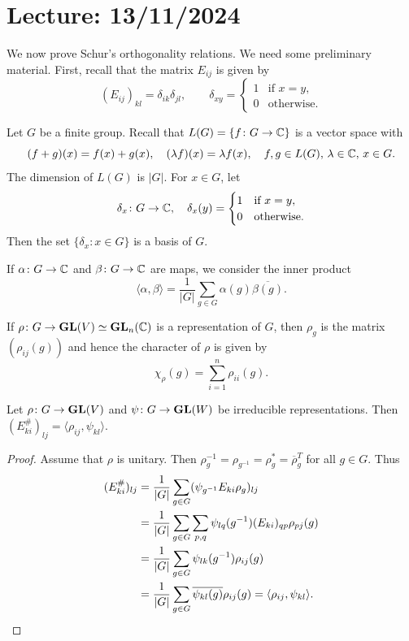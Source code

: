\section{Lecture: 13/11/2024}
\label{8}

We now prove Schur's orthogonality relations. We need some preliminary material. First, recall that 
the matrix $E_{ij}$ is given by 
\[
(E_{ij})_{kl}=\delta_{ik}\delta_{jl},
\qquad
\delta_{xy}=\begin{cases}
    1 & \text{if $x=y$},\\
    0 & \text{otherwise}.
\end{cases}
\]

Let $G$ be a finite group. 
Recall that $L(G)=\{f\colon G\to\mathbb{C}\}$ is a vector space with
\[
    (f+g)(x)=f(x)+g(x),
    \quad
    (\lambda f)(x)=\lambda f(x),
    \quad 
    f,g\in L(G),\,\lambda\in\mathbb{C},\,x\in G.
\]
The dimension of $L(G)$ is $|G|$. For $x\in G$, 
let 
\[
\delta_x\colon G\to\mathbb{C},\quad \delta_x(y)=\begin{cases}
    1 & \text{if $x=y$},\\
    0 & \text{otherwise.}
    \end{cases}
\]
Then the set
$\{\delta_x:x\in G\}$ is a basis of $G$. 

If $\alpha\colon G\to\mathbb{C}$ and $\beta\colon G\to\mathbb{C}$ 
are maps, we consider the inner product
\[
\langle\alpha,\beta\rangle=\frac{1}{|G|}\sum_{g\in G}\alpha(g)\overline{\beta(g)}.
\]

If $\rho\colon G\to\mathbf{GL}(V)\simeq\mathbf{GL}_n(\mathbb{C})$ is a representation of $G$, then
$\rho_g$ is the matrix $(\rho_{ij}(g))$ and hence the character of $\rho$ is given by
\[
\chi_\rho(g)=\sum_{i=1}^n\rho_{ii}(g).
\]



\begin{lemma}
Let $\rho\colon G\to\mathbf{GL}(V)$ and $\psi\colon G\to\mathbf{GL}(W)$ be irreducible representations. Then
$(E_{ki}^\#)_{lj}=\langle\rho_{ij},\psi_{kl}\rangle$.
\end{lemma}

\begin{proof}
  Assume that $\rho$ is unitary. Then $\rho^{-1}_g=\rho_{g^{-1}}=\rho^*_g=\overline{\rho}_g^T$ for all $g\in G$. 
  Thus  
  \begin{align*}
      (E_{ki}^\#)_{lj} &= \frac{1}{|G|}\sum_{g\in G}(\psi_{g^{-1}}E_{ki}\rho_g)_{lj}\\
      &=\frac{1}{|G|}\sum_{g\in G}\sum_{p,q}\psi_{lq}(g^{-1})(E_{ki})_{qp}\rho_{pj}(g)\\
      &=\frac{1}{|G|}\sum_{g\in G}\psi_{lk}(g^{-1})\rho_{ij}(g)\\
      &=\frac{1}{|G|}\sum_{g\in G}\overline{\psi_{kl}(g)}\rho_{ij}(g)=\langle \rho_{ij},\psi_{kl}\rangle.\qedhere
  \end{align*}
\end{proof}

